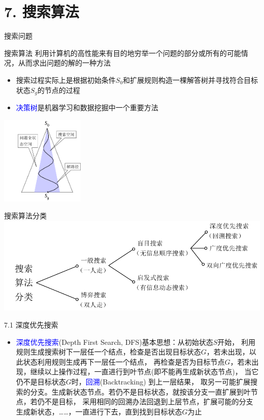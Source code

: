 


\frame{\titlepage}
\section{7. 搜索算法}
\begin{frame}{搜索问题}
    \begin{block}{搜索算法}
        利用计算机的高性能来有目的地穷举一个问题的部分或所有的可能情况，从而求出问题的解的一种方法
    \end{block}
    \begin{itemize}
        \item 搜索过程实际上是根据初始条件$S_0$和扩展规则构造一棵解答树并寻找符合目标状态$S_g$的节点的过程
        \item \textcolor{blue}{决策树}是机器学习和数据挖掘中一个重要方法
    \end{itemize}
    \includegraphics[width=0.3\textwidth,center]{fig/7-1.pdf}
\end{frame}
\begin{frame}{搜索算法分类}
    \includegraphics[width=\textwidth]{fig/7-2.pdf}
\end{frame}
\begin{frame}{7.1 深度优先搜索}
    \begin{itemize}
        \item \textcolor{blue}{深度优先搜索}(Depth First Search, DFS)基本思想：从初始状态$S$开始，
        利用规则生成搜索树下一层任一个结点，检查是否出现目标状态$G$，若未出现，以此状态利用规则生成再下一层任一个结点，
        再检查是否为目标节点$G$，若未出现，继续以上操作过程，一直进行到叶节点(即不能再生成新状态节点)，
        当它仍不是目标状态$G$时，\textcolor{blue}{回溯}(Backtracking) 到上一层结果，
        取另一可能扩展搜索的分支。生成新状态节点。若仍不是目标状态，就按该分支一直扩展到叶节点，若仍不是目标，
        采用相同的回溯办法回退到上层节点，扩展可能的分支生成新状态，……，一直进行下去，直到找到目标状态$G$为止
    \end{itemize}
\end{frame}
